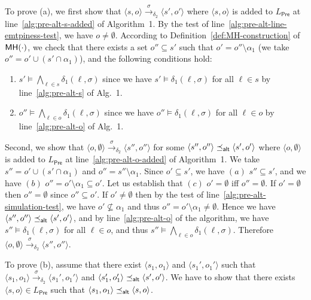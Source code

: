 \documentclass{LMCS}
\newcommand{\Pre}{\mathsf{Pre}}
\renewcommand{\l}{{\ell}}
\newcommand{\tuple}[1]{\langle #1 \rangle}
\newcommand{\MH}{{\sf MH}}
\begin{document}
To prove (a), we first show that $\tuple{s,o} \xrightarrow{\sigma}_{\delta_2} \tuple{s',o'}$
where $\tuple{s,o}$ is added to $L_{\Pre}$ at line~\ref{alg:pre-alt-s-added} of 
Algorithm~1.
By the test of line~\ref{alg:pre-alt-line-emtpiness-test}, we have $o \neq \emptyset$. 
According to Definition~\ref{def:MH-construction} of $\MH(\cdot)$, we check that 
there exists a set $o'' \subseteq s'$ such that $o' = o'' \setminus \alpha_1$
(we take $o'' = o' \cup (s' \cap \alpha_1)$), and the following conditions hold:
\begin{enumerate}[$(i)$]
\item $s' \models \bigwedge_{\l \in s} \delta_1(\l,\sigma)$ since 
we have $s' \models \delta_1(\l,\sigma)$ for all $\l \in s$ 
by line~\ref{alg:pre-alt-s} of Alg.~1.\item $o'' \models \bigwedge_{\l \in o} \delta_1(\l,\sigma)$ since
we have $o'' \models \delta_1(\l,\sigma)$ for all $\l \in o$
by line~\ref{alg:pre-alt-o} of Alg.~1.\end{enumerate}

Second, we show that $\tuple{o,\emptyset} \xrightarrow{\sigma}_{\delta_2} \tuple{s'',o''}$ for 
some $\tuple{s'',o''} \preceq_{{\sf alt}} \tuple{s',o'}$ where $\tuple{o,\emptyset}$
is added to $L_{\Pre}$ at line~\ref{alg:pre-alt-o-added} of Algorithm~1.
We take $s'' = o' \cup (s' \cap \alpha_1)$ and $o'' = s'' \setminus \alpha_1$. 
Since $o' \subseteq s'$, we  have $(a)$ $s'' \subseteq s'$,
and we have $(b)$ $o'' = o' \setminus \alpha_1 \subseteq o'$. 
Let us establish that $(c)$ $o' = \emptyset$ iff $o'' = \emptyset$.
If $o' = \emptyset$ then $o'' = \emptyset$ since $o'' \subseteq o'$.
If $o' \neq \emptyset$ then by the test of line~\ref{alg:pre-alt-simulation-test},
we have $o' \not\subseteq \alpha_1$ and thus $o'' = o' \setminus \alpha_1 \neq \emptyset$.
Hence we have $\tuple{s'',o''} \preceq_{{\sf alt}} \tuple{s',o'}$,
and by line~\ref{alg:pre-alt-o} of the algorithm, we have 
$s'' \models \delta_1(\l,\sigma)$ for all $\l \in o$, and thus 
$s'' \models \bigwedge_{\l \in o} \delta_1(\l,\sigma)$. Therefore
$\tuple{o,\emptyset} \xrightarrow{\sigma}_{\delta_2} \tuple{s'',o''}$.

To prove (b), assume that there exist $\tuple{s_1,o_1}$ and $\tuple{s_1',o_1'}$
such that $\tuple{s_1,o_1} \xrightarrow{\sigma}_{\delta_2} \tuple{s_1',o_1'}$ and 
$\tuple{s_1',o_1'} \preceq_{{\sf alt}} \tuple{s',o'}$.
We have to show that there exists $\tuple{s,o} \in L_{\Pre}$ such that 
$\tuple{s_1,o_1} \preceq_{{\sf alt}} \tuple{s,o}$.
\end{document}
